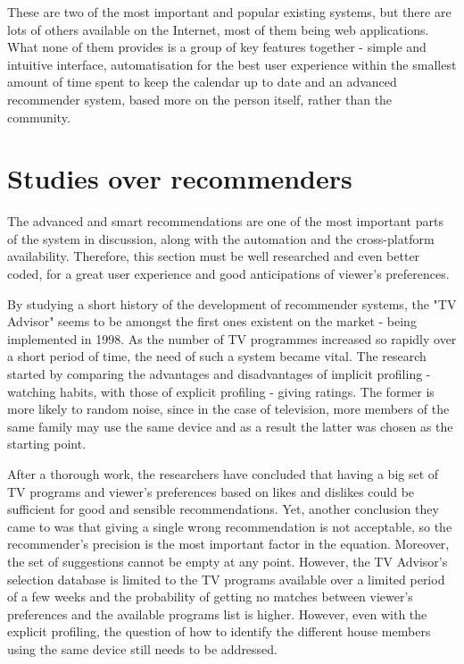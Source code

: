 These are two of the most important and popular existing systems, but there are lots of others available on the Internet, most of them being web applications. What none of them provides is a group of key features together - simple and intuitive interface, automatisation for the best user experience within the smallest amount of time spent to keep the calendar up to date and an advanced recommender system, based more on the person itself, rather than the community.

\section{Studies over recommenders}

The advanced and smart recommendations are one of the most important parts of the system in discussion, along with the automation and the cross-platform availability. Therefore, this section must be well researched and even better coded, for a great user experience and good anticipations of viewer's preferences.

By studying a short history of the development of recommender systems, the "TV Advisor" \cite{6} seems to be amongst the first ones existent on the market - being implemented in 1998. 
As the number of TV programmes increased so rapidly over a short period of time, the need of such a system became vital. The research started by comparing the advantages and disadvantages of implicit profiling - watching habits, with those of explicit profiling - giving ratings. The former is more likely to random noise, since in the case of television, more members of the same family may use the same device and as a result the latter was chosen as the starting point.

After a thorough work, the researchers have concluded that having a big set of TV programs and viewer's preferences based on likes and dislikes could be sufficient for good and sensible recommendations. Yet, another conclusion they came to was that giving a single wrong recommendation is not acceptable, so the recommender's precision is the most important factor in the equation. Moreover, the set of suggestions cannot be empty at any point. However, the TV Advisor's selection database is limited to the TV programs available over a limited period of a few weeks and the probability of getting no matches between viewer's preferences and the available programs list is higher. However, even with the explicit profiling, the question of how to identify the different house members using the same device still needs to be addressed.

